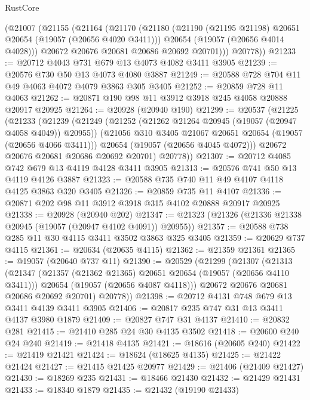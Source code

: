 \begin{lexlean}{RustCore}
\begin{coremodule}
      (@21007
        (@21155
          (@21164
            (@21170
              (@21180
                (@21190 (@21195 @21198) @20651 @20654 (@19057 (@20656 @4020 @3411)))
                @20654
                (@19057 (@20656 @4014 @4028)))
              @20672
              @20676
              @20681
              @20686
              @20692
              @20701)))
        @20778))
@21233 := @20712 @4043 @731 @679 @13 @4073 @4082 @3411 @3905
@21239 := @20576 @730 @50 @13 @4073 @4080 @3887
@21249 := @20588 @728 @704 @11 @49 @4063 @4072 @4079 @3863 @305 @3405
@21252 := @20859 @728 @11 @4063
@21262 := @20871 @190 @98 @11 @3912 @3918 @245 @4058 @20888 @20917 @20925
@21264 := @20928 (@20940 @190)
@21299 := @20537
    (@21225
      (@21233
        (@21239
          (@21249
            (@21252 (@21262 @21264 @20945 (@19057 (@20947 @4058 @4049)) @20955))
            (@21056 @310 @3405 @21067 @20651 @20654 (@19057 (@20656 @4066 @3411)))
            @20654
            (@19057 (@20656 @4045 @4072)))
          @20672
          @20676
          @20681
          @20686
          @20692
          @20701)
        @20778))
@21307 := @20712 @4085 @742 @679 @13 @4119 @4128 @3411 @3905
@21313 := @20576 @741 @50 @13 @4119 @4126 @3887
@21323 := @20588 @735 @740 @11 @49 @4107 @4118 @4125 @3863 @320 @3405
@21326 := @20859 @735 @11 @4107
@21336 := @20871 @202 @98 @11 @3912 @3918 @315 @4102 @20888 @20917 @20925
@21338 := @20928 (@20940 @202)
@21347 := @21323 (@21326 (@21336 @21338 @20945 (@19057 (@20947 @4102 @4091)) @20955))
@21357 := @20588 @738 @285 @11 @30 @4115 @3411 @3502 @3863 @325 @3405
@21359 := @20629 @737 @4115
@21361 := @20634 (@20635 @4115)
@21362 := @21359 @21361
@21365 := @19057 (@20640 @737 @11)
@21390 := @20529
    (@21299
      (@21307
        (@21313
          (@21347
            (@21357 (@21362 @21365) @20651 @20654 (@19057 (@20656 @4110 @3411)))
            @20654
            (@19057 (@20656 @4087 @4118)))
          @20672
          @20676
          @20681
          @20686
          @20692
          @20701)
        @20778))
@21398 := @20712 @4131 @748 @679 @13 @3411 @4139 @3411 @3905
@21406 := @20817 @235 @747 @31 @13 @3411 @4137 @3980 @1879
@21409 := @20827 @747 @31 @4137
@21410 := @20832 @281
@21415 := @21410 @285 @24 @30 @4135 @3502
@21418 := @20600 @240 @24 @240
@21419 := @21418 @4135
@21421 := @18616 (@20605 @240)
@21422 := @21419 @21421
@21424 := @18624 (@18625 @4135)
@21425 := @21422 @21424
@21427 := @21415 @21425 @20977
@21429 := @21406 (@21409 @21427)
@21430 := @18269 @235
@21431 := @18466 @21430
@21432 := @21429 @21431
@21433 := @18340 @1879
@21435 := @21432 (@19190 @21433)

\end{coremodule}
\end{lexlean}
